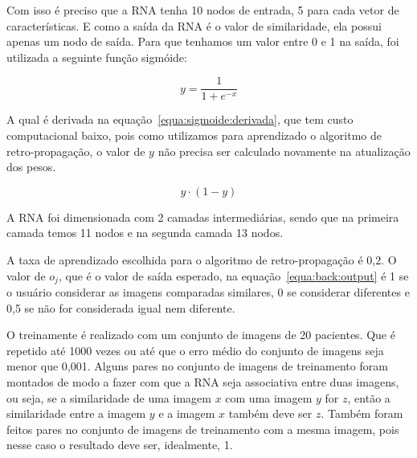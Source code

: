 Com isso é preciso que a RNA tenha 10 nodos de entrada, 5 para cada vetor de características. E como a saída da RNA é o valor de similaridade, ela possui apenas um nodo de saída. Para que tenhamos um valor entre 0 e 1 na saída, foi utilizada a seguinte função sigmóide:

\begin{equation}
	y = \frac{1}{1 + e^{-x}}
\end{equation}

A qual é derivada na equação~\ref{equa:sigmoide:derivada}, que tem custo computacional baixo, pois como utilizamos para aprendizado o algoritmo de retro-propagação, o valor de $y$ não precisa ser calculado novamente na atualização dos pesos.

\begin{equation}
	y \cdot (1 - y)
	\label{equa:sigmoide:derivada}
\end{equation}

A RNA foi dimensionada com 2 camadas intermediárias, sendo que na primeira camada temos 11 nodos e na segunda camada 13 nodos.

A taxa de aprendizado escolhida para o algoritmo de retro-propagação é 0,2. O valor de $o_j$, que é o valor de saída esperado, na equação~\ref{equa:back:output} é 1 se o usuário considerar as imagens comparadas similares, 0 se considerar diferentes e 0,5 se não for considerada igual nem diferente.

O treinamente é realizado com um conjunto de imagens de 20 pacientes. Que é repetido até 1000 vezes ou até que o erro médio do conjunto de imagens seja menor que 0,001. Alguns pares no conjunto de imagens de treinamento foram montados de modo a fazer com que a RNA seja associativa entre duas imagens, ou seja, se a similaridade de uma imagem $x$ com uma imagem $y$ for $z$, então a similaridade entre a imagem $y$ e a imagem $x$ também deve ser $z$. Também foram feitos pares no conjunto de imagens de treinamento com a mesma imagem, pois nesse caso o resultado deve ser, idealmente, 1.